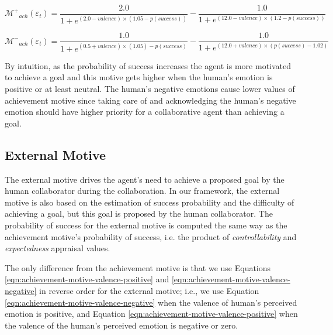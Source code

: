 \documentclass[12pt]{report}
\begin{document}
\begin{equation}
\mathcal{M^{+}}_{ach}(\varepsilon_t)=
\frac{2.0}{1+e^{(2.0-valence)\times(1.05-p(success))}}
- \frac{1.0}{1+e^{(12.0-valence)\times(1.2-p(success))}}
\label{eqn:achievement-motive-valence-positive}
\end{equation}

\begin{equation}
\mathcal{M^{-}}_{ach}(\varepsilon_t)=
\frac{1.0}{1+e^{(0.5+valence)\times(1.05)-p(success)}}
- \frac{1.0}{1+e^{(12.0+valence)\times(p(success)-1.02)}}
\label{eqn:achievement-motive-valence-negative}
\end{equation}

By intuition, as the probability of success increases the agent is more
motivated to achieve a goal and this motive gets higher when the human's
emotion is positive or at least neutral. The human's negative emotions cause
lower values of achievement motive since taking care of and acknowledging the
human's negative emotion should have higher priority for a collaborative agent
than achieving a goal.

\subsection{External Motive}
The external motive drives the agent's need to achieve a proposed goal by the
human collaborator during the collaboration. In our framework, the external
motive is also based on the estimation of success probability and the difficulty
of achieving a goal, but this goal is proposed by the human collaborator. The
probability of success for the external motive is computed the same way as the
achievement motive's probability of success, i.e. the product of
\textit{controllability} and \textit{expectedness} appraisal values.

The only difference from the achievement motive is that we use Equations
\ref{eqn:achievement-motive-valence-positive} and
\ref{eqn:achievement-motive-valence-negative} in reverse order for the external
motive; i.e., we use Equation \ref{eqn:achievement-motive-valence-negative}
when the valence of human's perceived emotion is positive, and Equation
\ref{eqn:achievement-motive-valence-positive} when the valence of the human's
perceived emotion is negative or zero.
\end{document}
